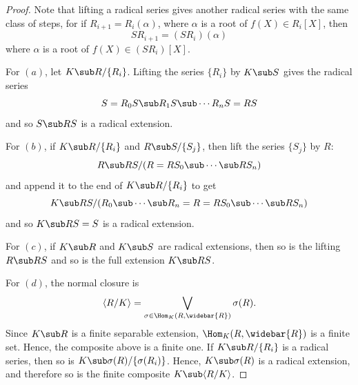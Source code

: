 \begin{proof}
Note that lifting a radical series gives another radical series with the same class of steps, for if $R_{i+1}=R_i(\alpha)$, where $\alpha$ is a root of $f(X)\in R_i[X]$, then
\[SR_{i+1}=(SR_i)(\alpha)\]
where $\alpha$ is a root of $f(X)\in(SR_i)[X]$.\par
For $(a)$, let $K\sub R/\{R_i\}$. Lifting the series $\{R_i\}$ by $K\sub S$ gives the radical series
\[S=R_0S\sub R_1S\sub\cdots R_nS=RS\]
and so $S\sub RS$ is a radical extension.\par
For $(b)$, if $K\sub R/\{R_i\}$ and $R\sub S/\{S_j\}$, then lift the series $\{S_j\}$ by $R$:
\[R\sub RS/(R=RS_0\sub\cdots\sub RS_n)\]
and append it to the end of $K\sub R/\{R_i\}$ to get
\[K\sub RS/(R_0\sub\cdots\sub R_n=R=RS_0\sub\cdots\sub RS_n)\]
and so $K\sub RS=S$ is a radical extension.\par
For $(c)$, if $K\sub R$ and $K\sub S$ are radical extensions, then so is the lifting $R\sub RS$ and so is the full extension $K\sub RS$.\par
For $(d)$, the normal closure is
\[\langle R/K\rangle=\bigvee_{\sigma\in\Hom_{K}(R,\widebar{R})}\sigma(R).\]
Since $K\sub R$ is a finite separable extension, $\Hom_{K}(R,\widebar{R})$ is a finite set. Hence, the composite above is a finite one. If $K\sub R/\{R_i\}$ is a radical series, then so is $K\sub\sigma(R)/\{\sigma(R_i)\}$. Hence, $K\sub\sigma(R)$ is a radical extension, and therefore so is the finite composite $K\sub\langle R/K\rangle$.
\end{proof}
